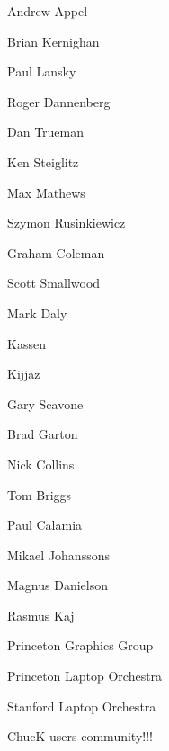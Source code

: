 \begin{chuckitemize}
\item Andrew Appel 
\item Brian Kernighan 
\item Paul Lansky 
\item Roger Dannenberg
\item Dan Trueman 
\item Ken Steiglitz 
\item Max Mathews
\item Szymon Rusinkiewicz 
\item Graham Coleman
\item Scott Smallwood
\item Mark Daly
\item Kassen
\item Kijjaz
\item Gary Scavone 
\item Brad Garton
\item Nick Collins 
\item Tom Briggs 
\item Paul Calamia 
\item Mikael Johanssons 
\item Magnus Danielson 
\item Rasmus Kaj 
\item Princeton Graphics Group
\item Princeton Laptop Orchestra
\item Stanford Laptop Orchestra
\item ChucK users community!!!
\end{chuckitemize}
